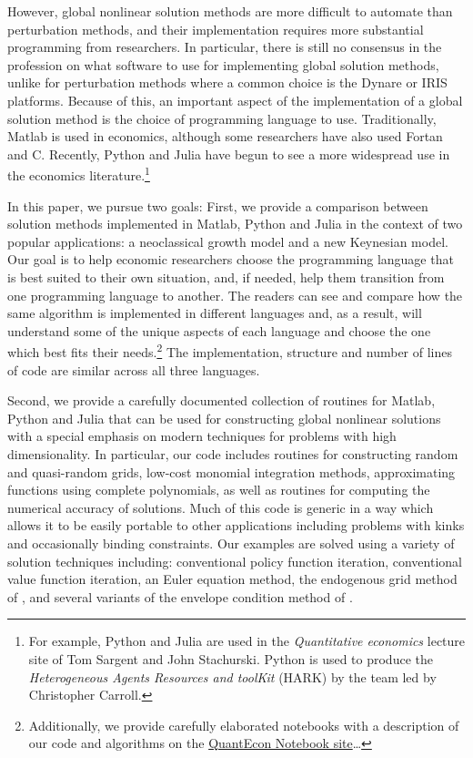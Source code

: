 However, global nonlinear solution methods are more difficult to automate than
perturbation methods, and their implementation requires more substantial
programming from researchers. In particular, there is still no consensus in the
profession on what software to use for implementing global solution methods,
unlike for perturbation methods where a common choice is the Dynare or IRIS platforms.
Because of this, an important aspect of the implementation of a global solution method is the
choice of programming language to use. Traditionally, Matlab is used in
economics, although some researchers have also used Fortan and C. Recently,
Python and Julia have begun to see a more widespread use in the economics
literature.\footnote{ For example, Python and Julia are used in the
\textit{Quantitative economics} lecture site of Tom Sargent and John
Stachurski. Python is used to produce the \textit{Heterogeneous Agents
Resources and toolKit} (HARK) by the team led by Christopher Carroll.}

In this paper, we pursue two goals: First, we provide a comparison between
solution methods implemented in Matlab, Python and Julia in the context of two
popular applications: a neoclassical growth model and a new Keynesian model.
Our goal is to help economic researchers choose the programming language that
is best suited to their own situation, and, if needed, help them transition
from one programming language to another. The readers can see and compare how
the same algorithm is implemented in different languages and, as a result, will
understand some of the unique aspects of each language and choose the one which
best fits their needs.\footnote{ Additionally, we provide carefully elaborated
notebooks with a description of our code and algorithms on the
\href{http://notes.quantecon.org}{QuantEcon Notebook site}\dots} The
implementation, structure and number of lines of code are similar across all
three languages.

Second, we provide a carefully documented collection of routines for Matlab,
Python and Julia that can be used for constructing global nonlinear solutions
with a special emphasis on modern techniques for problems with high
dimensionality. In particular, our code includes routines for constructing
random and quasi-random grids, low-cost monomial integration methods,
approximating functions using complete polynomials, as well as routines for
computing the numerical accuracy of solutions. Much of this code is generic in
a way which allows it to be easily portable to other applications including
problems with kinks and occasionally binding constraints. Our examples are
solved using a variety of solution techniques including: conventional policy
function iteration, conventional value function iteration, an Euler equation method,
the endogenous grid method of \cite{Carroll2006}, and several variants of the
envelope condition method of \cite{MM2015}.

